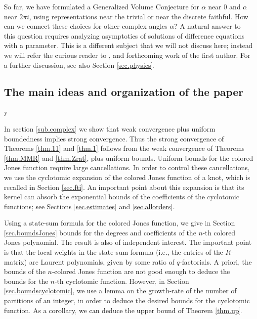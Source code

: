 \documentclass{amsart}
\theoremstyle{definition}
\def\printname#1{
    \if\draft y
        \smash{\makebox[0pt]{\hspace{-0.5in}
            \raisebox{8pt}{\tt\tiny #1}}}
    \fi
}
\def\lbl#1{\label{#1}\printname{#1}}
\def\a{\alpha}
\begin{document}
So far, we have formulated a Generalized Volume Conjecture for $\a$
near $0$ and $\a$ near $2\pi i$, using representations near the
trivial or near the discrete faithful. How can we
connect these choices for other complex angles $\a$? A natural
answer to this question requires analyzing asymptotics of solutions
of difference equations with a parameter. This is a different
subject that we will not discuss here; instead we will refer the
curious reader to \cite{GG}, and forthcoming work of the first
author. For a further discussion, see also Section
\ref{sec.physics}.





\subsection{The main ideas and organization of the paper}
\lbl{sub.ideas}

In section \ref{sub.complex} we show that weak convergence plus
uniform boundedness implies strong convergence. Thus the strong
convergence of
Theorems \ref{thm.11} and \ref{thm.1} follows from the weak
convergence of Theorems \ref{thm.MMR} and \ref{thm.Zrat},
plus uniform bounds.  Uniform bounds for the colored Jones function
require large cancellations. In order to control these cancellations,
we use the cyclotomic expansion of the colored Jones function of a
knot, which is recalled in Section \ref{sec.fti}. An important point
about this expansion is that its kernel can absorb the exponential
bounds of the coefficients of the cyclotomic functions; see Sections
\ref{sec.estimates} and \ref{sec.allorders}.




Using a state-sum formula for the colored Jones function, we give in
Section \ref{sec.boundsJones} bounds for the degrees and
coefficients of the $n$-th colored Jones polynomial. The result is
also of independent interest. The important point is that the local
weights in the state-sum formula (i.e., the entries of the
$R$-matrix) are Laurent polynomials, given by some ratio of
$q$-factorials. A priori, the bounds of the $n$-colored Jones
function are not good enough to deduce the bounds for the $n$-th
cyclotomic function. However, in Section \ref{sec.boundscyclotomic},
we use a lemma on the growth-rate of the number of partitions of an
integer, in order to deduce the desired bounds for the cyclotomic
function. As a corollary, we can deduce the upper bound of Theorem
\ref{thm.up}.
\end{document}
